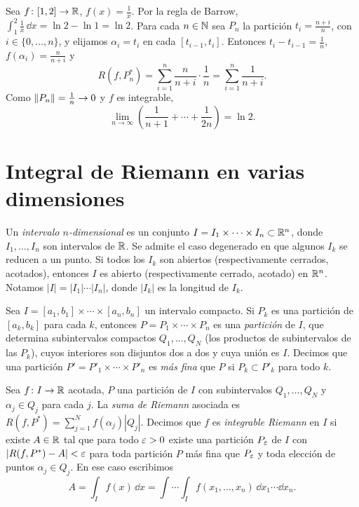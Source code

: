 \begin{eg}
  Sea \(f\colon [1, 2] \to \mathbb{R}\), \(f(x) = \frac{1}{x}\). Por la regla de Barrow, \(\int_1^2 \frac{1}{x} \,\dd x = \ln 2 - \ln 1 = \ln 2\). Para cada \(n \in \mathbb{N}\) sea \(P_n\) la partición \(t_i = \frac{n + i}{n}\), con \(i \in \{0, \dots, n\}\), y elijamos \(\alpha_i = t_i\) en cada \([t_{i-1}, t_i]\). Entonces \(t_i - t_{i-1} = \frac{1}{n}\), \(f(\alpha_i) = \frac{n}{n + i}\) y
  \[
    R(f, P_n^{*}) = \sum_{i=1}^{n} \frac{n}{n + i} \cdot \frac{1}{n} = \sum_{i=1}^{n} \frac{1}{n + i}.
  \]
  Como \(\left\lVert P_n \right\rVert = \frac{1}{n} \to 0\) y \(f\) es integrable,
  \[
    \lim_{n \to \infty} \left( \frac{1}{n + 1} + \cdots + \frac{1}{2n} \right) = \ln 2.
  \]
\end{eg}

\section{Integral de Riemann en varias dimensiones}

Un \emph{intervalo \(n\)-dimensional} es un conjunto \(I = I_1 \times \cdots \times I_n \subset \mathbb{R}^n\), donde \(I_1, \dots, I_n\) son intervalos de \(\mathbb{R}\). Se admite el caso degenerado en que algunos \(I_k\) se reducen a un punto. Si todos los \(I_k\) son abiertos (respectivamente cerrados, acotados), entonces \(I\) es abierto (respectivamente cerrado, acotado) en \(\mathbb{R}^n\). Notamos \(|I| = |I_1| \cdots |I_n|\), donde \(|I_k|\) es la longitud de \(I_k\).

Sea \(I = [a_1, b_1] \times \cdots \times [a_n, b_n]\) un intervalo compacto. Si \(P_k\) es una partición de \([a_k, b_k]\) para cada \(k\), entonces \(P = P_1 \times \cdots \times P_n\) es una \emph{partición} de \(I\), que determina subintervalos compactos \(Q_1, \dots, Q_N\) (los productos de subintervalos de las \(P_k\)), cuyos interiores son disjuntos dos a dos y cuya unión es \(I\). Decimos que una partición \(P' = P'_1 \times \cdots \times P'_n\) es \emph{más fina} que \(P\) si \(P_k \subset P'_k\) para todo \(k\).

\begin{definition}
  Sea \(f\colon I \to \mathbb{R}\) acotada, \(P\) una partición de \(I\) con subintervalos \(Q_1, \dots, Q_N\) y \(\alpha_j \in Q_j\) para cada \(j\). La \emph{suma de Riemann} asociada es \(R(f, P^{*}) = \sum_{j=1}^{N} f(\alpha_j) |Q_j|\). Decimos que \(f\) es \emph{integrable Riemann} en \(I\) si existe \(A \in \mathbb{R}\) tal que para todo \(\varepsilon > 0\) existe una partición \(P_{\varepsilon}\) de \(I\) con \(|R(f, P^{*}) - A| < \varepsilon\) para toda partición \(P\) más fina que \(P_{\varepsilon}\) y toda elección de puntos \(\alpha_j \in Q_j\). En ese caso escribimos
  \[
    A = \int_I f(x) \,\dd x = \int \cdots \int_I f(x_1, \dots, x_n) \,\dd x_1 \cdots \dd x_n.
  \]
\end{definition}

